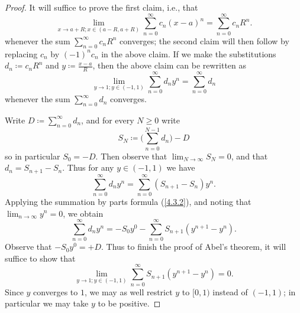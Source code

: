 \begin{proof}
  It will suffice to prove the first claim, i.e., that
  \[
    \lim_{x \to a + R ; x \in (a - R, a + R)} \sum_{n = 0}^\infty c_n (x - a)^n = \sum_{n = 0}^\infty c_n R^n.
  \]
  whenever the sum \(\sum_{n = 0}^\infty c_n R^n\) converges;
  the second claim will then follow by replacing \(c_n\) by \((-1)^n c_n\) in the above claim.
  If we make the substitutions \(d_n \coloneqq c_n R^n\) and \(y \coloneqq \frac{x - a}{R}\), then the above claim can be rewritten as
  \[
    \lim_{y \to 1 ; y \in (-1, 1)} \sum_{n = 0}^\infty d_n y^n = \sum_{n = 0}^\infty d_n
  \]
  whenever the sum \(\sum_{n = 0}^\infty d_n\) converges.

  Write \(D \coloneqq \sum_{n = 0}^\infty d_n\), and for every \(N \geq 0\) write
  \[
    S_N \coloneqq \bigg(\sum_{n = 0}^{N - 1} d_n\bigg) - D
  \]
  so in particular \(S_0 = -D\).
  Then observe that \(\lim_{N \to \infty} S_N = 0\), and that \(d_n = S_{n + 1} - S_n\).
  Thus for any \(y \in (-1, 1)\) we have
  \[
    \sum_{n = 0}^\infty d_n y^n = \sum_{n = 0}^\infty (S_{n + 1} - S_n) y^n.
  \]
  Applying the summation by parts formula (\cref{4.3.2}), and noting that \(\lim_{n \to \infty} y^n = 0\), we obtain
  \[
    \sum_{n = 0}^\infty d_n y^n = - S_0 y^0 - \sum_{n = 0}^\infty S_{n + 1} (y^{n + 1} - y^n).
  \]
  Observe that \(- S_0 y^0 = +D\).
  Thus to finish the proof of Abel's theorem,
  it will suffice to show that
  \[
    \lim_{y \to 1 ; y \in (-1, 1)} \sum_{n = 0}^\infty S_{n + 1} (y^{n + 1} - y^n) = 0.
  \]
  Since \(y\) converges to \(1\), we may as well restrict \(y\) to \([0, 1)\) instead of \((-1, 1)\);
  in particular we may take \(y\) to be positive.


\end{proof}
